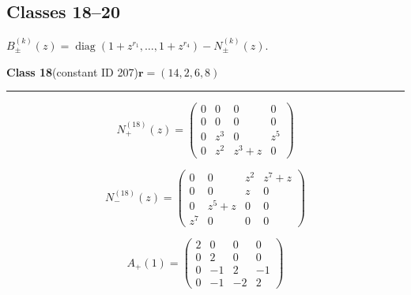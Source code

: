 \subsection*{Classes 18--20}
\noindent $B_\pm^{(k)}(z)=\operatorname{diag}(1+z^{r_1},\ldots,1+z^{r_4})-N_\pm^{(k)}(z)$.\par\medskip
\noindent\begin{minipage}{\linewidth}
\noindent\textbf{Class 18}\quad\small (constant ID 207)\hfill $\symbf{r}=(14,2,6,8)$
\par\smallskip\noindent\textcolor{rulegray}{\rule{\linewidth}{0.3pt}}
\begin{minipage}[c]{0.495\linewidth}\centering\fontsize{9.7}{12}\selectfont
\setlength{\abovedisplayskip}{4pt}\setlength{\belowdisplayskip}{4pt}
\setlength{\abovedisplayshortskip}{4pt}\setlength{\belowdisplayshortskip}{4pt}
\setlength{\arraycolsep}{3pt}\renewcommand{\arraystretch}{1.08}
\[N_{+}^{(18)}(z)=\begin{pmatrix}0 & 0 & 0 & 0\\0 & 0 & 0 & 0\\0 & z^{3} & 0 & z^{5}\\0 & z^{2} & z^{3} + z & 0\end{pmatrix}\]
\end{minipage}%
\begin{minipage}[c]{0.495\linewidth}\centering\fontsize{9.7}{12}\selectfont
\setlength{\abovedisplayskip}{4pt}\setlength{\belowdisplayskip}{4pt}
\setlength{\abovedisplayshortskip}{4pt}\setlength{\belowdisplayshortskip}{4pt}
\setlength{\arraycolsep}{3pt}\renewcommand{\arraystretch}{1.08}
\[N_{-}^{(18)}(z)=\begin{pmatrix}0 & 0 & z^{2} & z^{7} + z\\0 & 0 & z & 0\\0 & z^{5} + z & 0 & 0\\z^{7} & 0 & 0 & 0\end{pmatrix}\]
\end{minipage}%
\par\noindent
\begin{minipage}[c]{0.495\linewidth}\centering\fontsize{9.7}{12}\selectfont
\setlength{\abovedisplayskip}{4pt}\setlength{\belowdisplayskip}{4pt}
\setlength{\abovedisplayshortskip}{4pt}\setlength{\belowdisplayshortskip}{4pt}
\setlength{\arraycolsep}{3pt}\renewcommand{\arraystretch}{1.08}
\[A_{+}(1)=\begin{pmatrix}2 & 0 & 0 & 0\\0 & 2 & 0 & 0\\0 & -1 & 2 & -1\\0 & -1 & -2 & 2\end{pmatrix}\]

\end{minipage}
\end{minipage}
